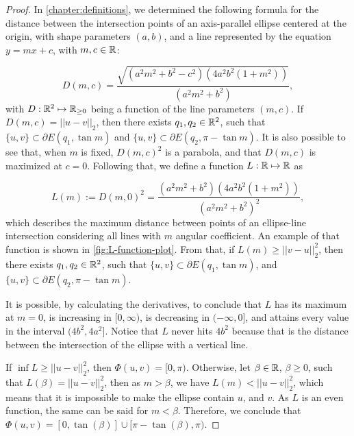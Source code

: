\begin{proof}
	
	In \autoref{chapter:definitions}, we determined the following formula for the distance between the intersection points of an axis-parallel ellipse centered at the origin, with shape parameters $(a,b)$, and a line represented by the equation $y=mx+c$, with $m, c\in \mathbb{R}$:
	
	\begin{equation*}\label{eq:dist_line_ellipse}
	D(m, c)=\dfrac{\sqrt{(a^2m^2+b^2-c^2)(4a^2b^2(1+m^2))}}{(a^2m^2+b^2)},
	\end{equation*}
	with $D : \mathbb{R}^2 \mapsto \mathbb{R}_{\ge0}$ being a function of the line parameters $(m, c)$.
	If $D(m, c) = ||u-v||_2$, then there exists $q_1, q_2 \in \mathbb{R}^2$, such that $\{u, v\} \subset \partial E(q_1, \tan{m})$ and $\{u, v\} \subset \partial E(q_2, \pi-\tan{m})$. It is also possible to see that, when $m$ is fixed, $D(m, c)^2$ is a parabola, and that $D(m, c)$ is maximized at $c=0$.  
	Following that, we define a function $L:\mathbb{R}\mapsto\mathbb{R}$ as
	
	\begin{equation*}
	L(m):= D(m, 0)^2 = \dfrac{(a^2m^2+b^2)(4a^2b^2(1+m^2))}{(a^2m^2+b^2)^2},
	\end{equation*}
	which describes the maximum distance between points of an ellipse-line intersection considering all lines with $m$ angular coefficient. 
	An example of that function is shown in \autoref{fig:L-function-plot}.	
	From that, if $L(m) \ge ||v-u||_2^2$, then there exists $q_1, q_2\in\mathbb{R}^2$, such that $\{u, v\} \subset \partial E(q_1, \tan{m})$, and $\{u, v\} \subset \partial E(q_2, \pi-\tan{m})$.
	
	It is possible, by calculating the derivatives, to conclude that $L$ has its maximum at $m=0$, is increasing in $[0, \infty)$, is decreasing in $(-\infty, 0]$, and attains every value in the interval $(4b^2, 4a^2]$. Notice that $L$ never hits $4b^2$ because that is the distance between the intersection of the ellipse with a vertical line.
	
	If $\inf{L} \ge ||u-v||_2^2$, then $\Phi(u,v) = [0, \pi)$.
	Otherwise, let $\beta \in \mathbb{R}$, $\beta \ge 0$, such that $L(\beta) = ||u-v||_2^2$, then as $m>\beta$, we have $L(m) < ||u-v||_2^2$, which means that it is impossible to make the ellipse contain $u$, and $v$.
	As $L$ is an even function, the same can be said for $m < \beta$. Therefore, we conclude that $\Phi(u,v)=[0, \tan(\beta)] \cup [\pi-\tan(\beta), \pi)$.
\end{proof}

